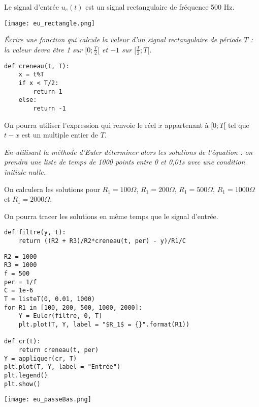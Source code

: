 Le signal d'entrée $u_e(t)$ est un signal rectangulaire de fréquence 500 Hz.
\begin{center}
\texttt{[image: eu\_rectangle.png]}
\end{center}
\begin{Exercise}\it
Écrire une fonction  qui calcule la valeur d'un signal rectangulaire de période $T$ : la valeur devra être 1 sur $[0;\frac T2[$ et $-1$ sur $[\frac T2;T[$.

\end{Exercise}
\begin{Answer}
\begin{lstlisting}
def creneau(t, T):
    x = t%T
    if x < T/2:
        return 1
    else:
        return -1
\end{lstlisting}
\end{Answer}
On pourra utiliser l'expression  qui renvoie le réel $x$ appartenant à $[0;T[$ tel que $t-x$ est un multiple entier de $T$.
\begin{Exercise}\it
En utilisant la méthode d'Euler déterminer alors les solutions de l'équation : on prendra une liste de temps de 1000 points entre 0 et 0,01s avec une condition initiale nulle. 

On calculera les solutions pour $R_1=100\Omega$, $R_1=200\Omega$, $R_1=500\Omega$, $R_1=1000\Omega$ et $R_1=2000\Omega$. 

On pourra tracer les solutions en même temps que le signal d'entrée.
\end{Exercise}
\begin{Answer}
\begin{lstlisting}
def filtre(y, t):
    return ((R2 + R3)/R2*creneau(t, per) - y)/R1/C
\end{lstlisting}

\begin{lstlisting}
R2 = 1000
R3 = 1000
f = 500
per = 1/f
C = 1e-6
T = listeT(0, 0.01, 1000)
for R1 in [100, 200, 500, 1000, 2000]:
    Y = Euler(filtre, 0, T)
    plt.plot(T, Y, label = "$R_1$ = {}".format(R1))
    
def cr(t):
    return creneau(t, per)
Y = appliquer(cr, T)
plt.plot(T, Y, label = "Entrée")
plt.legend()
plt.show()
\end{lstlisting}
\begin{center}
	\texttt{[image: eu\_passeBas.png]}
\end{center}
\newpage
\end{Answer}
